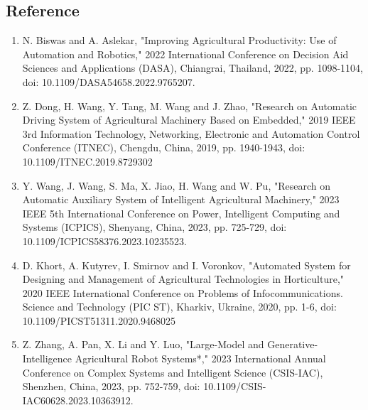 \documentclass{article}
\begin{document}
\begin{enumerate}
\section{Reference}
\begin{enumerate}


  \item  N. Biswas and A. Aslekar, "Improving Agricultural Productivity: Use of Automation and Robotics," 2022 International Conference on Decision Aid Sciences and Applications (DASA), Chiangrai, Thailand, 2022, pp. 1098-1104, doi: 10.1109/DASA54658.2022.9765207.
    
    \item Z. Dong, H. Wang, Y. Tang, M. Wang and J. Zhao, "Research on Automatic Driving System of Agricultural Machinery Based on Embedded," 2019 IEEE 3rd Information Technology, Networking, Electronic and Automation Control Conference (ITNEC), Chengdu, China, 2019, pp. 1940-1943, doi: 10.1109/ITNEC.2019.8729302
    \item Y. Wang, J. Wang, S. Ma, X. Jiao, H. Wang and W. Pu, "Research on Automatic Auxiliary System of Intelligent Agricultural Machinery," 2023 IEEE 5th International Conference on Power, Intelligent Computing and Systems (ICPICS), Shenyang, China, 2023, pp. 725-729, doi: 10.1109/ICPICS58376.2023.10235523.
 \item D. Khort, A. Kutyrev, I. Smirnov and I. Voronkov, "Automated System for Designing and Management of Agricultural Technologies in Horticulture," 2020 IEEE International Conference on Problems of Infocommunications. Science and Technology (PIC ST), Kharkiv, Ukraine, 2020, pp. 1-6, doi: 10.1109/PICST51311.2020.9468025
\item Z. Zhang, A. Pan, X. Li and Y. Luo, "Large-Model and Generative-Intelligence Agricultural Robot Systems*," 2023 International Annual Conference on Complex Systems and Intelligent Science (CSIS-IAC), Shenzhen, China, 2023, pp. 752-759, doi: 10.1109/CSIS-IAC60628.2023.10363912. 
\end{enumerate}
\end{enumerate}
\end{document}
